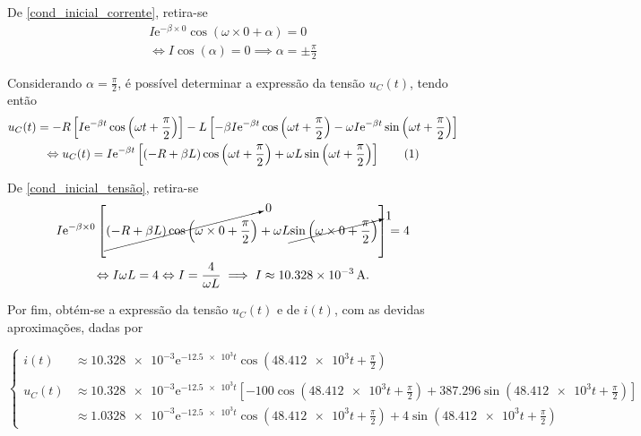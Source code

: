 \documentclass[a4paper, titlepage, portuguese]{article}
\newcommand{\eq}{\Leftrightarrow} %
\newcommand\numberthis{\addtocounter{equation}{1}\tag{\theequation}}
\newcommand\e{\mathrm{e} }
\begin{document}
		De \eqref{cond_inicial_corrente}, retira-se 
		\begin{align*}
			 I\e^{-\beta \times 0} \cos{(\omega \times 0 + \alpha)} = 0 \\ \eq
			 I\cos{(\alpha)} = 0 \implies \alpha = \pm \frac{\pi}{2}
		\end{align*}
		
		Considerando $\alpha =  \frac{\pi}{2}$, é possível determinar a expressão da tensão $u_{C}(t)$, tendo então 
		\begin{gather*}
			u_C(t) = -R \left[ I\e^{-\beta t} \cos{\left(\omega t + \frac{\pi}{2}\right)} \right] - L \left[ -\beta I\e^{-\beta t} \cos{\left(\omega t + \frac{\pi}{2}\right)} - \omega I\e^{-\beta t} \sin{\left(\omega t + \frac{\pi}{2}\right)}\right] \\ \eq
			u_C(t) = I\e^{-\beta t} \left[ \left( -R +\beta L\right) \cos{\left(\omega t + \frac{\pi}{2}\right)}  + \omega L\sin{\left(\omega t + \frac{\pi}{2}\right)} \right] \numberthis \label{Uc_RLC}
			\end{gather*}
			
		De \eqref{cond_inicial_tensão}, retira-se 
		\begin{gather*}
			 I\e^{-\beta \times 0} \left[ \cancelto{0}{\left( -R +\beta L\right) \cos{\left(\omega \times 0 + \frac{\pi}{2}\right)}}  + \omega L \cancelto{1}{\sin{\left(\omega \times 0 + \frac{\pi}{2}\right)}} \right] = 4 \\ \eq
			 I\omega L = 4 \eq I = \frac{4}{\omega L} \implies I \approx \SI{10.328e-3}{\ampere}.
		\end{gather*}
		
		Por fim, obtém-se a expressão da tensão $u_{C}(t)$ e de $i(t)$, com as devidas aproximações, dadas por
		
		\begin{equation}
   			\begin{cases}
      			i(t) &\approx \num{10.328e-3}\e^{-\num{12.5e3}t} \cos{(\num{48.412e3} t + \frac{\pi}{2})} \\
    			\\u_C(t) &\approx \num{10.328e-3}\e^{-\num{12.5e3} t} \left[ -100 \cos{\left(\num{48.412e3} t + \frac{\pi}{2}\right)}  + \num{387.296}\sin{\left(\num{48.412e3}t + \frac{\pi}{2}\right)} \right] \\ 
			&\approx \num{1.0328e-3}\e^{-\num{12.5e3} t} \cos{\left(\num{48.412e3} t + \frac{\pi}{2}\right)}  + \num{4}\sin{\left(\num{48.412e3}t + \frac{\pi}{2}\right)}
  			\end{cases}       
		\end{equation}
		
\end{document}
